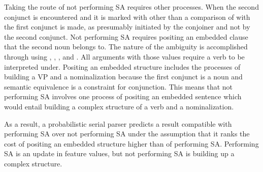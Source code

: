 Taking the route of not performing SA requires other processes. When the second conjunct is encountered and it is marked with {\Case} other than {\Nom} a comparison of {\Case} with the first conjunct is made, as presumably initiated by the conjoiner and not by the second conjunct. Not performing SA requires positing an embedded clause that the second noun belongs to. The nature of the ambiguity is accomplished through using {\Acc}, {\Dat}, {\Loc}, and {\Abl}. All arguments with those {\Case} values require a verb to be interpreted under. Positing an embedded structure includes the processes of building a VP and a nominalization because the first conjunct is a noun and semantic equivalence is a constraint for conjunction. This means that not performing SA involves one process of positing an embedded sentence which would entail building a complex structure of a verb and a nominalization.

As a result, a probabilistic serial parser predicts a result compatible with performing SA over not performing SA under the assumption that it ranks the cost of positing an embedded structure higher than of performing SA. Performing SA is an update in feature values, but not performing SA is building up a complex structure.